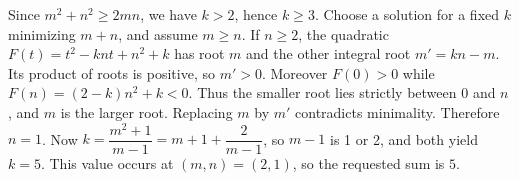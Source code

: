 Since $ m^2+n^2\ge2mn $, we have $ k>2 $, hence $ k\ge3 $. Choose a solution for a fixed $ k $ minimizing $ m+n $, and assume $ m\ge n $. If $ n\ge2 $, the quadratic $ F(t)=t^2-knt+n^2+k $ has root $ m $ and the other integral root $ m'=kn-m $. Its product of roots is positive, so $ m'>0 $. Moreover $ F(0)>0 $ while $ F(n)=(2-k)n^2+k<0 $. Thus the smaller root lies strictly between 0 and $ n $, and $ m $ is the larger root. Replacing $ m $ by $ m'$ contradicts minimality. Therefore $ n=1 $. Now $ k=\dfrac{m^2+1}{m-1}=m+1+\dfrac{2}{m-1}$, so $ m-1 $ is 1 or 2, and both yield $ k=5 $. This value occurs at $(m,n)=(2,1)$, so the requested sum is $\boxed5 $.
